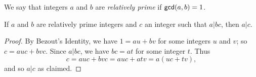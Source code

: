 \begin{dfn}
We say that integers \(a\) and \(b\) are \emph{relatively prime} if \(\mathsf{gcd}(a, b) = 1\).
\end{dfn}

\begin{thm}
If \(a\) and \(b\) are relatively prime integers and \(c\) an integer such that \(a | bc\), then \(a|c\).
\end{thm}

\begin{proof}
By Bezout's Identity, we have \(1 = au + bv\) for some integers \(u\) and \(v\); so \(c = auc + bvc\).
Since \(a|bc\), we have \(bc = at\) for some integer \(t\).
Thus \[ c = auc + bvc = auc + atv = a(uc + tv), \] and so \(a|c\) as claimed.
\end{proof}

